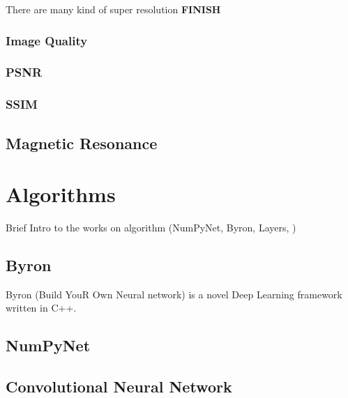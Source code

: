 \documentclass[12pt,a4paper]{report}
\begin{document}
There are many kind of super resolution {\bf FINISH}

\subsection*{Image Quality}

\subsection*{PSNR}
\subsection*{SSIM}

\section{Magnetic Resonance}


\chapter{Algorithms}

Brief Intro to the works on algorithm (NumPyNet, Byron, Layers, )

\section{Byron}

Byron (Build YouR Own Neural network) is a novel Deep Learning framework written in C++. 

\section{NumPyNet}

\section{Convolutional Neural Network}
\end{document}
